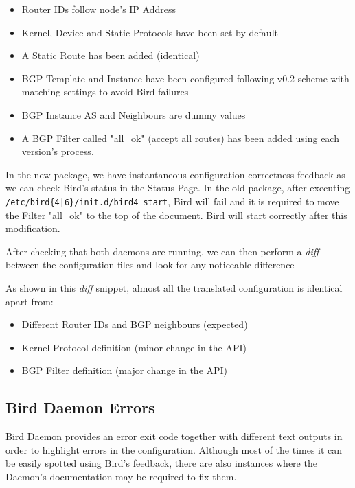 \begin{itemize}
\item Router IDs follow node's IP Address
\item Kernel, Device and Static Protocols have been set by default
\item A Static Route has been added  (identical)
\item BGP Template and Instance have been configured following v0.2 scheme with matching settings to avoid Bird failures
\item BGP Instance AS and Neighbours are dummy values
\item A BGP Filter called "all\_ok" (accept all routes) has been added using each version's process.
\end{itemize}

In the new package, we have instantaneous configuration correctness feedback as we can check Bird's status in the Status Page. 
In the old package, after executing \texttt{/etc/bird\{4|6\}/init.d/bird4 start}, Bird will fail and it is required to move the Filter "all\_ok" to the top of the document. Bird will start correctly after this modification.

After checking that both daemons are running, we can then perform a \textit{diff} between the configuration files and look for any noticeable difference

%


As shown in this \textit{diff} snippet, almost all the translated configuration is identical apart from:

\begin{itemize}
\item Different Router IDs and BGP neighbours (expected)
\item Kernel Protocol definition (minor change in the API)
\item BGP Filter definition (major change in the API)
\end{itemize}

\subsection{Bird Daemon Errors}
Bird Daemon provides an error exit code together with different text outputs in order to highlight errors in the configuration. Although most of the times it can be easily spotted using Bird's feedback, there are also instances where the Daemon's documentation may be required to fix them.

